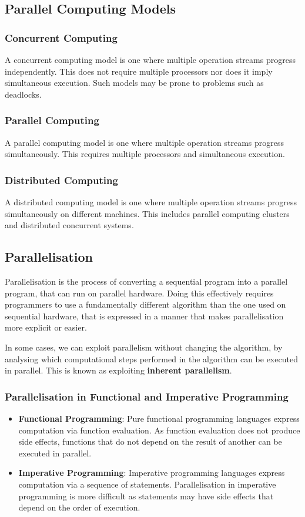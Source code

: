 \documentclass{article}
\begin{document}
\subsection{Parallel Computing Models}
\subsubsection{Concurrent Computing}
A concurrent computing model is one where multiple operation streams
progress independently. This does not require multiple processors nor
does it imply simultaneous execution. Such models may be prone to
problems such as deadlocks.
\subsubsection{Parallel Computing}
A parallel computing model is one where multiple operation streams
progress simultaneously. This requires multiple processors and
simultaneous execution.
\subsubsection{Distributed Computing}
A distributed computing model is one where multiple operation streams
progress simultaneously on different machines. This includes parallel
computing clusters and distributed concurrent systems.
\subsection{Parallelisation}
Parallelisation is the process of converting a sequential program into
a parallel program, that can run on parallel hardware. Doing this
effectively requires programmers to use a fundamentally different
algorithm than the one used on sequential hardware, that is expressed
in a manner that makes parallelisation more explicit or easier.

In some cases, we can exploit parallelism without changing the
algorithm, by analysing which computational steps performed in the
algorithm can be executed in parallel. This is known as exploiting
\textbf{inherent parallelism}.
\subsubsection{Parallelisation in Functional and Imperative Programming}
\begin{itemize}
    \item \textbf{Functional Programming}: Pure functional programming
          languages express computation via function evaluation. As
          function evaluation does not produce side effects, functions
          that do not depend on the result of another can be executed in
          parallel.
    \item \textbf{Imperative Programming}: Imperative programming
          languages express computation via a sequence of statements.
          Parallelisation in imperative programming is more difficult
          as statements may have side effects that depend on the order
          of execution.
\end{itemize}
\end{document}
